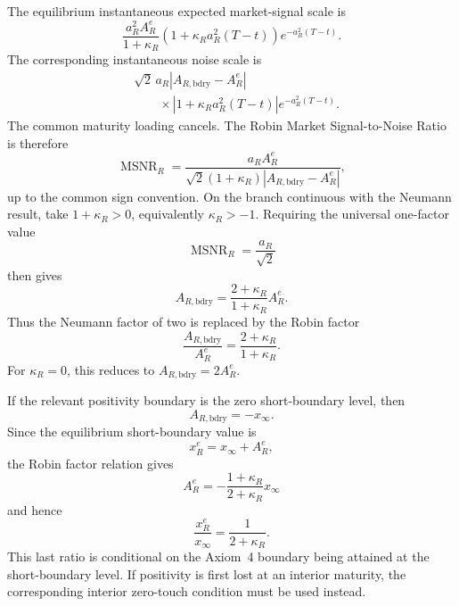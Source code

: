 \documentclass[12pt]{article}
\numberwithin{equation}{subsection}
\newcommand{\MSNR}{\operatorname{MSNR}}
\begin{document}
The equilibrium instantaneous expected market-signal scale is
\begin{equation}
\frac{a_R^2A_R^e}{1+\kappa_R}
\left(1+\kappa_Ra_R^2(T-t)\right)
e^{-a_R^2(T-t)}.
\end{equation}
The corresponding instantaneous noise scale is
\begin{equation}
\begin{aligned}
&\sqrt2\,a_R|A_{R,\mathrm{bdry}}-A_R^e|
\\
&\qquad\times
\left|1+\kappa_Ra_R^2(T-t)\right|
e^{-a_R^2(T-t)}.
\end{aligned}
\end{equation}
The common maturity loading cancels. The Robin Market Signal-to-Noise Ratio is therefore
\begin{equation}
\boxed{\MSNR_R
=
\frac{a_RA_R^e}
{\sqrt2(1+\kappa_R)|A_{R,\mathrm{bdry}}-A_R^e|},}
\end{equation}
up to the common sign convention. On the branch continuous with the Neumann result, take $1+\kappa_R>0$, equivalently $\kappa_R>-1$. Requiring the universal one-factor value
\begin{equation}
\MSNR_R=\frac{a_R}{\sqrt2}
\end{equation}
then gives
\begin{equation}
A_{R,\mathrm{bdry}}
=
\frac{2+\kappa_R}{1+\kappa_R}A_R^e.
\end{equation}
Thus the Neumann factor of two is replaced by the Robin factor
\begin{equation}
\frac{A_{R,\mathrm{bdry}}}{A_R^e}
=
\frac{2+\kappa_R}{1+\kappa_R}.
\end{equation}
For $\kappa_R=0$, this reduces to $A_{R,\mathrm{bdry}}=2A_R^e$.

If the relevant positivity boundary is the zero short-boundary level, then
\begin{equation}
A_{R,\mathrm{bdry}}=-x_\infty.
\end{equation}
Since the equilibrium short-boundary value is
\begin{equation}
x_R^e=x_\infty+A_R^e,
\end{equation}
the Robin factor relation gives
\begin{equation}
A_R^e=-\frac{1+\kappa_R}{2+\kappa_R}x_\infty
\end{equation}
and hence
\begin{equation}
\frac{x_R^e}{x_\infty}=\frac{1}{2+\kappa_R}.
\end{equation}
This last ratio is conditional on the Axiom~4 boundary being attained at the short-boundary level. If positivity is first lost at an interior maturity, the corresponding interior zero-touch condition must be used instead.
\end{document}
